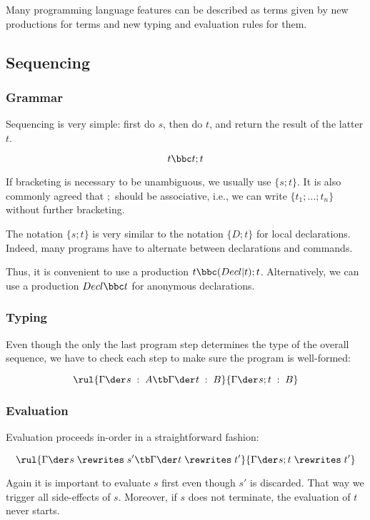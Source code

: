 Many programming language features can be described as terms given by new productions for terms and new typing and evaluation rules for them.

\subsection{Sequencing}

\subsubsection{Grammar}

Sequencing is very simple: first do $s$, then do $t$, and return the result of the latter $t$.

\[t\bbc t;t\]

If bracketing is necessary to be unambiguous, we usually use $\{s;t\}$.
It is also commonly agreed that $;$ should be associative, i.e., we can write $\{t_1;\ldots;t_n\}$ without further bracketing.

The notation $\{s;t\}$ is very similar to the notation $\{D;t\}$ for local declarations.
Indeed, many programs have to alternate between declarations and commands.

Thus, it is convenient to use a production $t\bbc (Decl|t);t$.
Alternatively, we can use a production $Decl \bbc t$ for anonymous declarations.

\subsubsection{Typing}

Even though the only the last program step determines the type of the overall sequence, we have to check each step to make sure the program is well-formed:

\[\rul{\oftype{}{\Gamma}{s}{A}\tb \oftype{}{\Gamma}{t}{B}}
      {\oftype{}{\Gamma}{s;t}{B}}
\]

\subsubsection{Evaluation}

Evaluation proceeds in-order in a straightforward fashion:

\[\rul{\evobj{}{\Gamma}{s}{s'}\tb \evobj{}{\Gamma}{t}{t'}}
      {\evobj{}{\Gamma}{s;t}{t'}}
\]

Again it is important to evaluate $s$ first even though $s'$ is discarded.
That way we trigger all side-effects of $s$.
Moreover, if $s$ does not terminate, the evaluation of $t$ never starts.

